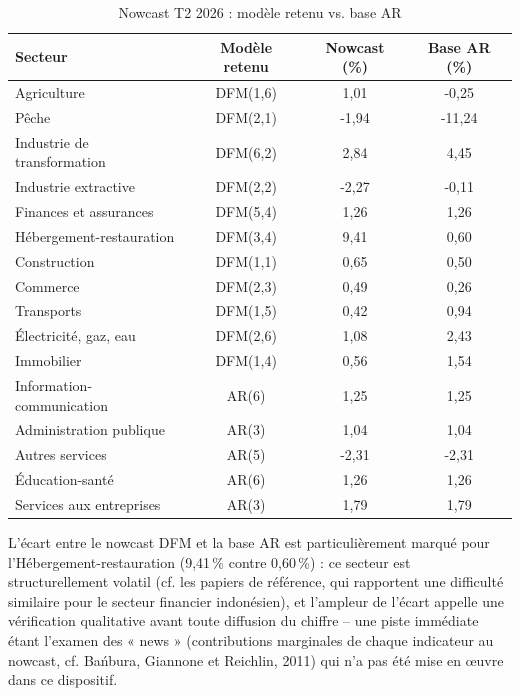 \documentclass[11pt,a4paper]{report}
\begin{document}
\begin{table}[H]
\centering
\caption{Nowcast T2 2026 : modèle retenu vs. base AR}
\label{tab:nowcast}
\begin{tabular}{lccc}
\toprule
Secteur & Modèle retenu & Nowcast (\%) & Base AR (\%) \\
\midrule
Agriculture                 & DFM(1,6) & \phantom{-}1,01 & -0,25 \\
Pêche                       & DFM(2,1) & -1,94 & -11,24 \\
Industrie de transformation & DFM(6,2) & \phantom{-}2,84 & \phantom{-}4,45 \\
Industrie extractive        & DFM(2,2) & -2,27 & -0,11 \\
Finances et assurances      & DFM(5,4) & \phantom{-}1,26 & \phantom{-}1,26 \\
Hébergement-restauration    & DFM(3,4) & \phantom{-}9,41 & \phantom{-}0,60 \\
Construction                & DFM(1,1) & \phantom{-}0,65 & \phantom{-}0,50 \\
Commerce                    & DFM(2,3) & \phantom{-}0,49 & \phantom{-}0,26 \\
Transports                  & DFM(1,5) & \phantom{-}0,42 & \phantom{-}0,94 \\
Électricité, gaz, eau       & DFM(2,6) & \phantom{-}1,08 & \phantom{-}2,43 \\
Immobilier                  & DFM(1,4) & \phantom{-}0,56 & \phantom{-}1,54 \\
Information-communication   & AR(6)    & \phantom{-}1,25 & \phantom{-}1,25 \\
Administration publique     & AR(3)    & \phantom{-}1,04 & \phantom{-}1,04 \\
Autres services              & AR(5)    & -2,31 & -2,31 \\
Éducation-santé              & AR(6)    & \phantom{-}1,26 & \phantom{-}1,26 \\
Services aux entreprises     & AR(3)    & \phantom{-}1,79 & \phantom{-}1,79 \\
\bottomrule
\end{tabular}
\end{table}

L'écart entre le nowcast DFM et la base AR est particulièrement marqué pour l'Hébergement-restauration (9,41\,\% contre 0,60\,\%) : ce secteur est structurellement volatil (cf. les papiers de référence, qui rapportent une difficulté similaire pour le secteur financier indonésien), et l'ampleur de l'écart appelle une vérification qualitative avant toute diffusion du chiffre -- une piste immédiate étant l'examen des « news » (contributions marginales de chaque indicateur au nowcast, cf. Bańbura, Giannone et Reichlin, 2011) qui n'a pas été mise en \oe uvre dans ce dispositif.
\end{document}
